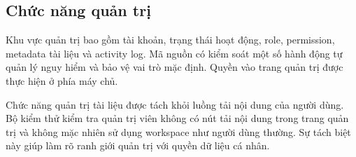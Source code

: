 \subsection{Chức năng quản trị}
Khu vực quản trị bao gồm tài khoản, trạng thái hoạt động, role, permission, metadata tài liệu và activity log. Mã nguồn có kiểm soát một số hành động tự quản lý nguy hiểm và bảo vệ vai trò mặc định. Quyền vào trang quản trị được thực hiện ở phía máy chủ.

Chức năng quản trị tài liệu được tách khỏi luồng tải nội dung của người dùng. Bộ kiểm thử kiểm tra quản trị viên không có nút tải nội dung trong trang quản trị và không mặc nhiên sử dụng workspace như người dùng thường. Sự tách biệt này giúp làm rõ ranh giới quản trị với quyền dữ liệu cá nhân.

